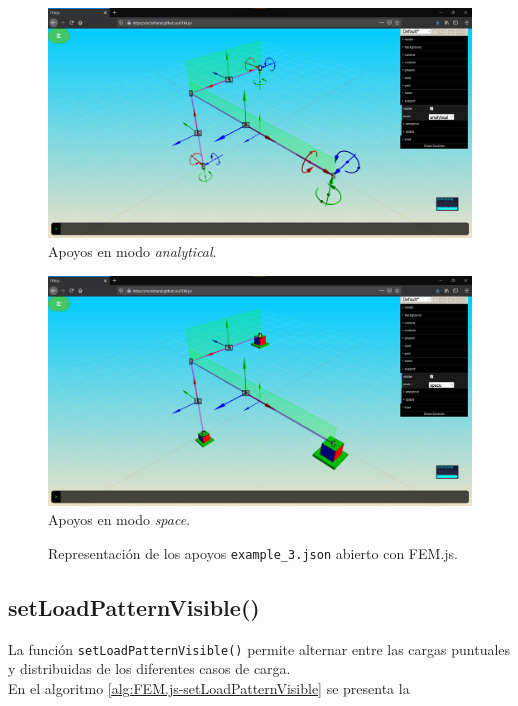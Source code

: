 \begin{figure}[ht]
  \centering
  \setlength{\columnseprule}{0pt}
  
  \begin{multicols}{2}
    \begin{minipage}[b]{0.8\columnwidth}
      \centering
      \includegraphics[width=\textwidth]{FEM.js/FEM.js-setSupportMode-analytical.png}
      Apoyos en modo \textit{analytical}.
    \end{minipage}
  
    \begin{minipage}[b]{0.8\columnwidth}
      \centering
      \includegraphics[width=\textwidth]{FEM.js/FEM.js-setSupportMode-space.png}
      Apoyos en modo \textit{space}.
    \end{minipage}
  \end{multicols}
  \caption{Representación de los apoyos \texttt{example\_3.json} abierto con FEM.js.}
  \label{fig:FEM.js-setSupportMode}
\end{figure}

\subsection{setLoadPatternVisible()}

La función \verb|setLoadPatternVisible()| permite alternar entre las cargas puntuales y distribuidas de los diferentes casos de carga.\\

En el algoritmo \ref{alg:FEM.js-setLoadPatternVisible} se presenta la 

